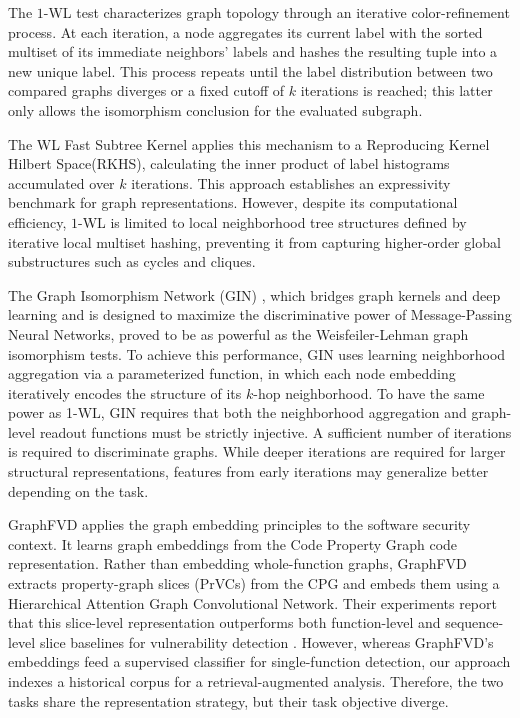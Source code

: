 The $1$-WL test characterizes graph topology through an iterative color-refinement process. 
At each iteration, a node aggregates its current label with the sorted multiset of its immediate neighbors' labels and hashes the resulting tuple into a new unique label. 
This process repeats until the label distribution between two compared graphs diverges or a fixed cutoff of $k$ iterations is reached; this latter only allows the isomorphism conclusion for the evaluated subgraph. 

The WL Fast Subtree Kernel \cite{shervashidze2011wl} applies this mechanism to a Reproducing Kernel Hilbert Space(RKHS), calculating the inner product of label histograms accumulated over $k$ iterations.
This approach establishes an expressivity benchmark for graph representations. 
However, despite its computational efficiency, $1$-WL is limited to local neighborhood tree structures defined by iterative local multiset hashing, preventing it from capturing higher-order global substructures such as cycles and cliques. 

The Graph Isomorphism Network (GIN) \cite{xu2019gin}, which bridges graph kernels and deep learning and is designed to maximize the discriminative power of Message-Passing Neural Networks, proved to be as powerful as the Weisfeiler-Lehman graph isomorphism tests. 
To achieve this performance, GIN uses learning neighborhood aggregation via a parameterized function, in which each node embedding iteratively encodes the structure of its $k$-hop neighborhood. 
To have the same power as 1-WL, GIN requires that both the neighborhood aggregation and graph-level readout functions must be strictly injective. 
A sufficient number of iterations is required to discriminate graphs.
While deeper iterations are required for larger structural representations, features from early iterations may generalize better depending on the task.

GraphFVD applies the graph embedding principles to the software security context.
It learns graph embeddings from the Code Property Graph code representation.
Rather than embedding whole-function graphs, GraphFVD extracts property-graph slices (PrVCs) from the CPG and embeds them using a Hierarchical Attention Graph Convolutional Network.
Their experiments report that this slice-level representation outperforms both function-level and sequence-level slice baselines for vulnerability detection \cite{shao2025graphfvd}. 
However, whereas GraphFVD's embeddings feed a supervised classifier for single-function detection, our approach indexes a historical corpus for a retrieval-augmented analysis.
Therefore, the two tasks share the representation strategy, but their task objective diverge.

